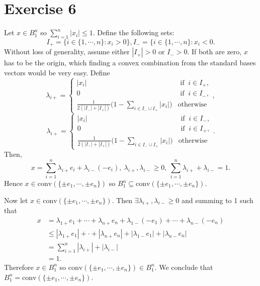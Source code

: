 \documentclass{article}
\begin{document}
\section*{Exercise 6}
Let $x \in B_1^n$ so $\sum_{i = 1}^{n} |x_i| \leq 1$. Define the following sets: 
\[ I_+ = \{ i \in \{1, \cdots, n\}: x_i > 0 \}, I_- = \{ i \in \{1, \cdots, n\}: x_i < 0. \]
Without loss of generality, assume either $|I_+| > 0$ or $I_- > 0$. If both are zero, $x$ has to be 
the origin, which finding a convex combination from the standard bases vectors would be very easy.
Define 
\[ \lambda_{i+} = \begin{cases}
	|x_i| &\text{ if } \ i \in I_+, \\
	0 &\text{ if } \ i \in I_-, \\
	\frac{1}{2(|I_-| + |I_+|)} \biggl( 1 - \sum_{i \in I_- \cup I_+}^{} |x_i| \biggr) &\text{otherwise}
\end{cases}, \]
\[ \lambda_{i+} = \begin{cases}
	|x_i| &\text{ if } \ i \in I_-, \\
	0 &\text{ if } \ i \in I_+, \\
	\frac{1}{2(|I_-| + |I_+|)} \biggl( 1 - \sum_{i \in I_- \cup I_+}^{} |x_i| \biggr) &\text{otherwise}
\end{cases}. \]
Then, 
\[ x = \sum_{i = 1}^{n} \lambda_{i+}e_i + \lambda_{i-} (-e_i), \ \lambda_{i+}, \lambda_{i-} \geq 0, \ \sum_{i = 1}^{n} 
\lambda_{i+} + \lambda_{i-} = 1. \]
Hence $x \in \text{conv}(\{\pm e_1, \cdots, \pm e_n\})$ so $B_1^n \subseteq \text{conv}(\{\pm e_1, \cdots, \pm e_n\})$.

Now let $x \in \text{conv}(\{\pm e_1, \cdots, \pm e_n\})$. Then $\exists \lambda_{i+}, \lambda_{i-} \geq 0$ and summing 
to 1 such that 
\begin{align*}
	x 
	&= \lambda_{1+} e_1 + \cdots + \lambda_{n+} e_n + \lambda_{1-} (-e_1) + \cdots + \lambda_{n-} (-e_n) \\
	&\leq |\lambda_{1+} e_1| + \cdot + |\lambda_{n+} e_n| + |\lambda_{1-} e_1| + |\lambda_{n-} e_n| \\
	&= \sum_{i = 1}^{n} |\lambda_{i+}| + |\lambda_{i-}| \\
	&= 1.
\end{align*}
Therefore $x \in B_1^n$ so $\text{conv}(\{\pm e_1, \cdots, \pm e_n\}) \in B_1^n$. We conclude that 
$B_1^n = \text{conv}(\{\pm e_1, \cdots, \pm e_n\})$. 


\newpage
\end{document}
